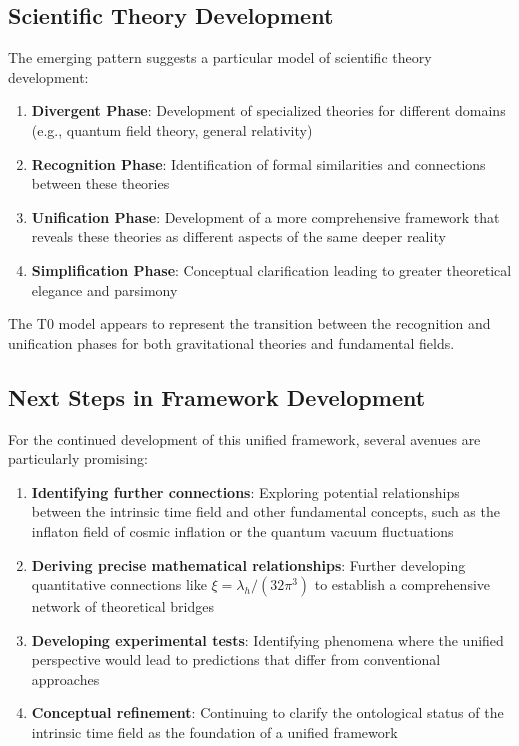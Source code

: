 \documentclass[12pt,a4paper]{article}
\begin{document}
	\subsection{Scientific Theory Development}
	\label{subsec:theory_development}
	
	The emerging pattern suggests a particular model of scientific theory development:
	
	\begin{enumerate}
		\item \textbf{Divergent Phase}: Development of specialized theories for different domains (e.g., quantum field theory, general relativity)
		
		\item \textbf{Recognition Phase}: Identification of formal similarities and connections between these theories
		
		\item \textbf{Unification Phase}: Development of a more comprehensive framework that reveals these theories as different aspects of the same deeper reality
		
		\item \textbf{Simplification Phase}: Conceptual clarification leading to greater theoretical elegance and parsimony
	\end{enumerate}
	
	The T0 model appears to represent the transition between the recognition and unification phases for both gravitational theories and fundamental fields.
	
	\subsection{Next Steps in Framework Development}
	\label{subsec:next_steps}
	
	For the continued development of this unified framework, several avenues are particularly promising:
	
	\begin{enumerate}
		\item \textbf{Identifying further connections}: Exploring potential relationships between the intrinsic time field and other fundamental concepts, such as the inflaton field of cosmic inflation or the quantum vacuum fluctuations
		
		\item \textbf{Deriving precise mathematical relationships}: Further developing quantitative connections like $\xi = \lambda_h/(32\pi^3)$ to establish a comprehensive network of theoretical bridges
		
		\item \textbf{Developing experimental tests}: Identifying phenomena where the unified perspective would lead to predictions that differ from conventional approaches
		
		\item \textbf{Conceptual refinement}: Continuing to clarify the ontological status of the intrinsic time field as the foundation of a unified framework
	\end{enumerate}
	
\end{document}
